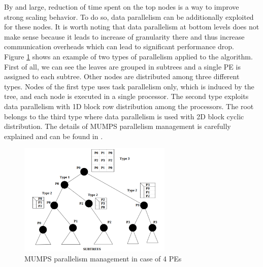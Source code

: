 By and large, reduction of time spent on the top nodes is a way to improve strong scaling behavior. To do so, data parallelism can be additionally exploited for these nodes. It is worth noting that data parallelism at bottom levels does not make sense because it leads to increase of granularity there and thus increase communication overheads which can lead to significant performance drop.\\


Figure \ref{fig:mumps-task-data-parallelism} shows an example of two types of parallelism applied to the algorithm. First of all, we can see the leaves are grouped in subtrees and a single PE is assigned to each subtree. Other nodes are distributed among three different types. Nodes of the first type uses task parallelism only, which is induced by the tree, and each node is executed in a single processor. The second type exploits data parallelism with 1D block row distribution among the processors. The root belongs to the third type where data parallelism is used with 2D block cyclic distribution. The details of MUMPS parallelism management is carefully explained and can be found in \cite{mumps:task-data-parallelism}.\\


\figpointer{\ref{fig:mumps-task-data-parallelism}}

\begin{figure}[htpb]
  \centering
  \includegraphics[width=0.65\textwidth]{figures/chapter-2/mumps-task-data-parallelism.png}
\caption{MUMPS parallelism management in case of 4 PEs \cite{mumps:task-data-parallelism}}
\label{fig:mumps-task-data-parallelism}
\end{figure}


